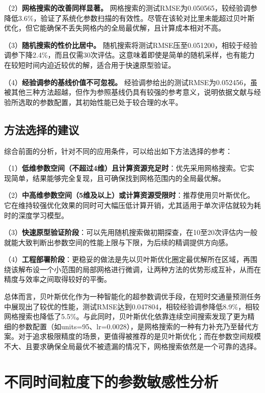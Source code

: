 \documentclass[12pt,a4paper,oneside]{ctexbook}
\begin{document}
	（2）\textbf{网格搜索的改善同样显著。} 网格搜索的测试RMSE为0.050565，较经验调参降低3.6\%，验证了系统化参数扫描的有效性。尽管在该轮对比里未能超过贝叶斯优化，但它能确保不丢失网格内的全局最优解，且计算成本相对不高。
	
	（3）\textbf{随机搜索的性价比居中。} 随机搜索将测试RMSE压至0.051200，相较于经验调参下降2.4\%，而且仅需30次评估。这意味着即使是简单的随机采样，也有能力在较短时间内迫近较优的解，适合用于快速原型验证。
	
	（4）\textbf{经验调参的基线价值不可忽视。} 经验调参给出的测试RMSE为0.052456，虽被其他三种方法超越，但作为参照基线仍具有较强的参考意义，说明依据文献与经验所选取的参数配置，其初始性能已处于较合理的水平。
	
	\subsection{方法选择的建议}
	
	综合前面的分析，针对不同的应用条件，可以给出如下方法选择的参考：
	
	（1）\textbf{低维参数空间（不超过4维）且计算资源充足时}：优先采用网格搜索。它实现简单，结果能够完全复现，且可确保找到网格范围内的全局最优解。
	
	（2）\textbf{中高维参数空间（5维及以上）或计算资源受限时}：推荐使用贝叶斯优化。它在维持较强优化效果的同时可大幅压低计算开销，尤其适用于单次评估就较为耗时的深度学习模型。
	
	（3）\textbf{快速原型验证阶段}：可以先用随机搜索做初期探查，在10至20次评估内一般就能大致判断出参数空间的性能上限与下限，为后续的精调提供方向感。
	
	（4）\textbf{工程部署阶段}：更稳妥的做法是先以贝叶斯优化圈定最优解所在区域，再围绕该解布设一个小范围的局部网格进行微调，让两种方法的优势形成互补，从而在精度与效率之间取得较好的平衡。
	
	总体而言，贝叶斯优化作为一种智能化的超参数调优手段，在短时交通量预测任务中展现出了较优的性能，测试RMSE达到0.047804，相较经验调参降低8.9\%，相较网格搜索也降低了5.5\%。与此同时，贝叶斯优化依靠连续空间搜索发现了更为精细的参数配置（如units=95、lr=0.0028），是网格搜索的一种有力补充乃至替代方案。对于追求极限精度的场景，更值得被推荐的是贝叶斯优化；而在参数空间规模不大、且要求确保全局最优不被遗漏的情况下，网格搜索依然是一个可靠的选择。
	
	\section{不同时间粒度下的参数敏感性分析}
	
\end{document}
